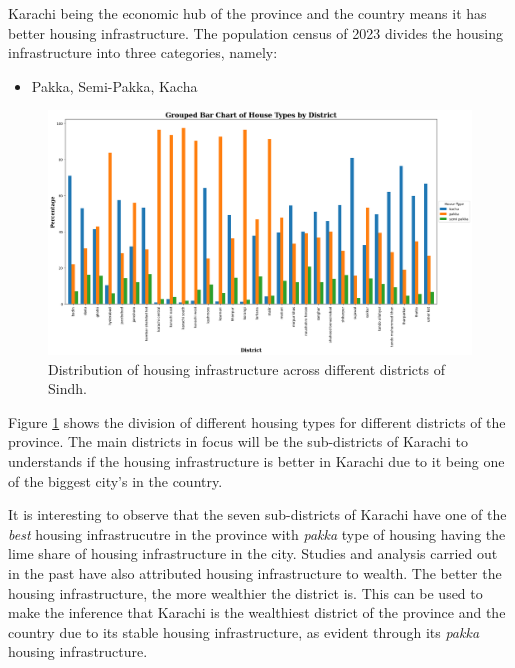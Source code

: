 \documentclass{article}
\begin{document}
\noindent Karachi being the economic hub of the province and the country means it has better housing infrastructure. The population census of 2023 divides the housing infrastructure into three categories, namely:

\begin{itemize}
    \item Pakka, Semi-Pakka, Kacha
\end{itemize}

\begin{figure}[H]
    \centering
    \includegraphics[width=\textwidth]{../Figures/Figure06.png}
    \caption{Distribution of housing infrastructure across different districts of Sindh.}
    \label{fig:fig5}
\end{figure}

\noindent Figure \ref{fig:fig5} shows the division of different housing types for different districts of the province. The main districts in focus will be the sub-districts of Karachi to understands if the housing infrastructure is better in Karachi due to it being one of the biggest city's in the country. 

\vspace{0.5cm}

\noindent It is interesting to observe that the seven sub-districts of Karachi have one of the \textit{best} housing infrastrucutre in the province with \textit{pakka} type of housing having the lime share of housing infrastructure in the city. Studies and analysis carried out in the past have also attributed housing infrastructure to wealth. The better the housing infrastructure, the more wealthier the district is. This can be used to make the inference that Karachi is the wealthiest district of the province and the country due to its stable housing infrastructure, as evident through its \textit{pakka} housing infrastructure.
\end{document}
